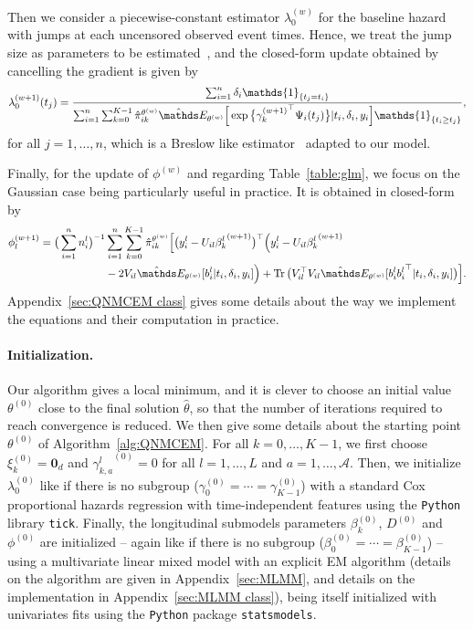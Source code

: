 \documentclass[11pt]{article}
\DeclareMathOperator{\Tr}{Tr}
\newcommand{\ind}[1]{\mathds{1}_{#1}}
\newcommand{\cA}{\mathcal A}
\newcommand{\E}{\mathds E}
\begin{document}
Then we consider a piecewise-constant estimator $\lambda_0^{(w)}$ for the baseline hazard with jumps at each uncensored observed event times. Hence, we treat the jump size as parameters to be estimated~\citep{klein1992semiparametric}, and the closed-form update obtained by cancelling the gradient is given by
\begin{equation}
  \label{eq:update_lambda_0}
  \lambda_0^{(w+1)}(t_j)= \dfrac{\sum_{i=1}^n \delta_i \ind{\{t_j=t_i\}}}{\sum_{i=1}^n \sum_{k=0}^{K-1} \hat \pi_{ik}^{\theta^{(w)}} \hat \E_{\theta^{(w)}}\Big[\exp \big\{{\gamma_k^{(w+1)}}^\top \Psi_i(t_j)\big\} | t_i, \delta_i, y_i \Big] \ind{\{t_i \geq t_j\}} },
\end{equation}
for all $j=1, \ldots, n$, which is a Breslow like estimator~\citep{breslow1972contribution} adapted to our model. 

Finally, for the update of $\phi^{(w)}$ and regarding Table~\ref{table:glm}, we focus on the Gaussian case being particularly useful in practice. It is obtained in closed-form by
\begin{align}
  \label{eq:update_phi}
  \phi_l^{(w+1)} = \big(\sum_{i=1}^n n_i^l \big)^{-1} &\sum_{i=1}^n \sum_{k=0}^{K-1} \hat \pi_{ik}^{\theta^{(w)}} \Big[ \big(y_i^l - U_{il} {\beta_k^l}^{(w+1)}\big)^\top \Big(y_i^l - U_{il} {\beta_k^l}^{(w+1)} \nonumber \\
  & - 2V_{il} \hat \E_{\theta^{(w)}}[ b_i^l | t_i, \delta_i, y_i]\Big) + \Tr\big(V_{il}^\top V_{il}\hat \E_{\theta^{(w)}}[ b_i^l {b_i^l}^\top | t_i, \delta_i, y_i]\big) \Big].
\end{align}
Appendix~\ref{sec:QNMCEM class} gives some details about the way we implement the equations and their computation in practice.

\paragraph*{Initialization.}
Our algorithm gives a local minimum, and it is clever to choose an initial value $\theta^{(0)}$ close to the final solution $\hat \theta$, so that the number of iterations required to reach convergence is reduced. We then give some details about the starting point $\theta^{(0)}$ of Algorithm~\ref{alg:QNMCEM}. 
For all $k = 0, \ldots, K-1$, we first choose $\xi_k^{(0)} = \mathbf{0}_d$ and ${\gamma_{k,a}^l}^{(0)} = 0$ for all $l=1, \ldots, L$ and $a=1, \ldots, \cA$. Then, we initialize $\lambda_0^{(0)}$ like if there is no subgroup ($\gamma_{0}^{(0)} = \cdots = \gamma_{K-1}^{(0)}$) with a standard Cox proportional hazards regression with time-independent features using the \texttt{Python} library \texttt{tick}. Finally, the longitudinal submodels parameters $\beta_k^{(0)}$, $D^{(0)}$ and $\phi^{(0)}$ are initialized -- again like if there is no subgroup ($\beta_0^{(0)} = \cdots = \beta_{K-1}^{(0)}$) -- using a multivariate linear mixed model with an explicit EM algorithm (details on the algorithm are given in Appendix~\ref{sec:MLMM}, and details on the implementation in Appendix~\ref{sec:MLMM class}), being itself initialized with univariates fits using the \texttt{Python} package \texttt{statsmodels}.
\end{document}
